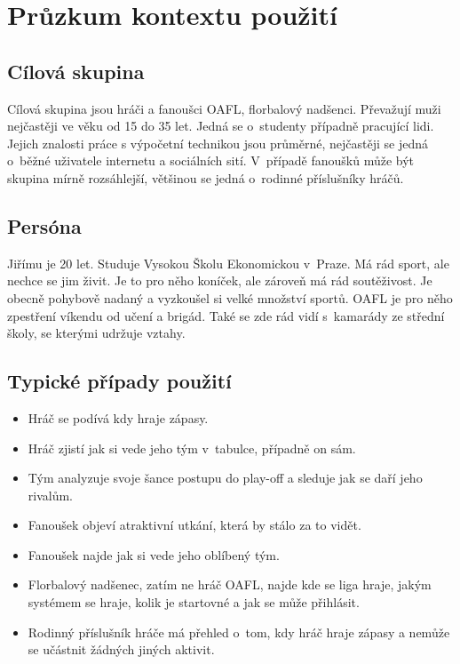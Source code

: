 \documentclass[11pt, a4paper, titlepage]{article}
\begin{document}

\section{Průzkum kontextu použití}

\subsection{Cílová skupina}

Cílová skupina jsou hráči a fanoušci OAFL, florbalový nadšenci. Převažují muži nejčastěji ve věku od 15 do 35 let. Jedná se o~studenty případně pracující lidi. Jejich znalosti práce s výpočetní technikou jsou průměrné, nejčastěji se jedná o~běžné uživatele internetu a sociálních sití. V~případě fanoušků může být skupina mírně rozsáhlejší, většinou se jedná o~rodinné příslušníky hráčů.

\subsection{Persóna}

Jiřímu je 20 let. Studuje Vysokou Školu Ekonomickou v~Praze. Má rád sport, ale nechce se jim živit. Je to pro něho koníček, ale zároveň má rád soutěživost. Je obecně pohybově nadaný a vyzkoušel si velké množství sportů. OAFL je pro něho zpestření víkendu od učení a brigád. Také se zde rád vidí s~kamarády ze střední školy, se kterými udržuje vztahy.

\subsection{Typické případy použití}

\begin{itemize}
    \item Hráč se podívá kdy hraje zápasy.
    \item Hráč zjistí jak si vede jeho tým v~tabulce, případně on sám.
    \item Tým analyzuje svoje šance postupu do play-off a sleduje jak se daří jeho rivalům.
    \item Fanoušek objeví atraktivní utkání, která by stálo za to vidět.
    \item Fanoušek najde jak si vede jeho oblíbený tým.
    \item Florbalový nadšenec, zatím ne hráč OAFL, najde kde se liga hraje, jakým systémem se hraje, kolik je startovné a jak se může přihlásit.
    \item Rodinný příslušník hráče má přehled o~tom, kdy hráč hraje zápasy a nemůže se učástnit žádných jiných aktivit.
\end{itemize}
\end{document}
